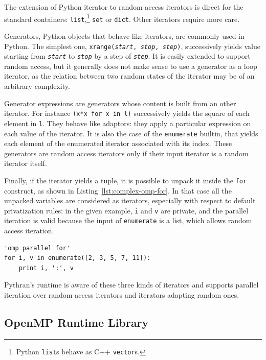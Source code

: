 \documentclass[conference]{IEEEtran}
\begin{document}
The extension of Python iterator to random access iterators is direct for the
standard containers: \texttt{list},\footnote{Python \texttt{list}s behave as C++
\texttt{vector}s.} \texttt{set} or \texttt{dict}. Other iterators require more
care.

Generators, Python objects that behave like iterators, are commonly used in
Python. The simplest one, \texttt{xrange(\emph{start}, \emph{stop},
\emph{step})}, successively yields value starting from \texttt{\emph{start}} to
\texttt{\emph{stop}} by a step of \texttt{\emph{step}}. It is easily extended to
support random access, but it generally does not make sense to use a generator
as a loop iterator, as the relation between two random states of the iterator
may be of an arbitrary complexity.

Generator expressions are generators whose content is built from an other
iterator. For instance \texttt{(x*x for x in l)} successively yields the square
of each element in \texttt{l}. They behave like adaptors: they apply a
particular expression on each value of the iterator. It is also the case of the
\texttt{enumerate} builtin, that yields each element of the enumerated iterator
associated with its index. These generators are random access iterators only if
their input iterator is a random iterator itself.

Finally, if the iterator yields a tuple, it is possible to unpack it inside the
\texttt{for} construct, as shown in Listing~\ref{lst:complex-omp-for}. In that
case all the unpacked variables are considered as iterators, especially with
respect to default privatization rules: in the given example, \texttt{i} and
\texttt{v} are private, and the parallel iteration is valid because the input of
\texttt{enumerate} is a list, which allows random access iteration.

\begin{lstlisting}[float, label={lst:complex-omp-for}, caption={Parallel
    loop in Pythran with tuple unpacking.}]
'omp parallel for'
for i, v in enumerate([2, 3, 5, 7, 11]):
    print i, ':', v
\end{lstlisting}

Pythran's runtime is aware of these three kinds of iterators and supports
parallel iteration over random access iterators and iterators adapting random
ones.

\subsection{OpenMP Runtime Library}
\end{document}
